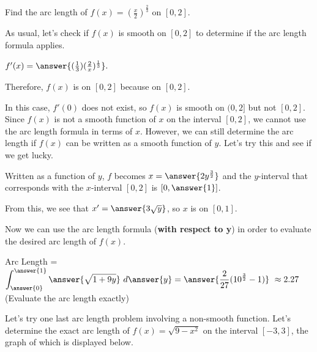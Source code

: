 \documentclass[handout,nooutcomes]{ximera}
\begin{document}
\begin{problem}
Find the arc length of $f(x) = \left(\frac{x}{2}\right)^{\frac{2}{3}}$ on $[0,2]$.

As usual, let's check if $f(x)$ is smooth on $[0,2]$ to determine if the arc length formula applies.

$f'(x) = \answer{(\frac{1}{3})(\frac{2}{x})^{\frac{1}{3}}}.$

Therefore, $f(x)$ is  on $[0,2]$ because  on $[0,2]$.

\begin{problem}
In this case, $f'(0)$ does not exist, so $f(x)$ is smooth on $(0,2]$ but not $[0,2]$.  Since $f(x)$ is not a smooth function of $x$ on the interval $[0,2]$, we cannot use the arc length formula in terms of $x$.  However, we can still determine the arc length if $f(x)$ can be written as a smooth function of $y$.  Let's try this and see if we get lucky.

Written as a function of $y$, $f$ becomes $x = \answer{2y^{\frac{3}{2}}}$ and the $y$-interval that corresponds with the $x$-interval $[0,2]$ is $[0, \answer{1}]$.

\begin{problem}
From this, we see that $x' = \answer{3\sqrt{y}}$, so $x$ is  on $[0,1]$.

\begin{problem}
Now we can use the arc length formula (\textbf{with respect to y}) in order to evaluate the desired arc length of $f(x).$

Arc Length = $\displaystyle\int_{\answer{0}}^{\answer{1}} \answer{\sqrt{1+9y}} \ d\answer{y} = \answer{\frac{2}{27}(10^{\frac{3}{2}}-1)} \ \approx 2.27$ (Evaluate the arc length exactly)

\end{problem}
\end{problem}
\end{problem}
\end{problem}


Let's try one last arc length problem involving a non-smooth function.  Let's determine the exact arc length of $f(x) = \sqrt{9-x^2}$ on the interval $[-3,3]$, the graph of which is displayed below.
\end{document}
